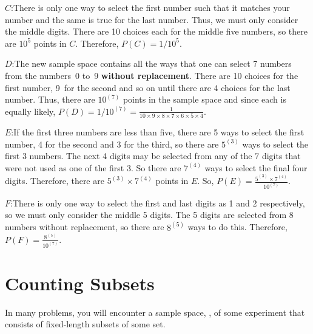 \begin{example}
\par\smallskip
$C$:\hspace{5mm}There is only one way to select the first number such that it matches your number and the same is true for the last number. Thus, we must only consider the middle digits. There are 10 choices each for the middle five numbers, so there are $10^5$ points in $C$. Therefore, $P(C) = 1/10^5$.
\par\medskip
$D$:\hspace{5mm}The new sample space contains all the ways that one can select 7 numbers from the numbers~0 to~9 \textbf{without replacement}. There are 10 choices for the first number, 9~for the second and so on until there are 4 choices for the last number. Thus, there are $10^{(7)}$ points in the sample space and since each is equally likely, $P(D) = 1/10^{(7)} = \frac{1}{10 \times 9 \times 8 \times 7 \times 6 \times 5 \times 4}$.
\par\smallskip
$E$:\hspace{5mm}If the first three numbers are less than five, there are 5 ways to select the first number, 4 for the second and 3 for the third, so there are $5^{(3)}$ ways to select the first 3 numbers. The next 4 digits may be selected from any of the 7 digits that were not used as one of the first 3. So there are $7^{(4)}$ ways to select the final four digits. Therefore, there are $5^{(3)} \times 7^{(4)}$ points in $E$. So, $P(E) = \frac{5^{(3)} \times 7^{(4)}}{10^{(7)}}$.
\par\smallskip
$F$:\hspace{5mm}There is only one way to select the first and last digits as 1 and 2 respectively, so we must only consider the middle 5 digits. The 5 digits are selected from 8 numbers without replacement, so there are $8^{(5)}$ ways to do this. Therefore, $P(F) = \frac{8^{(5)}}{10^{(7)}}$.
\end{example}
\section{Counting Subsets}
In many problems, you will encounter a sample space, \sS, of some experiment that consists of fixed-length subsets of some set.
